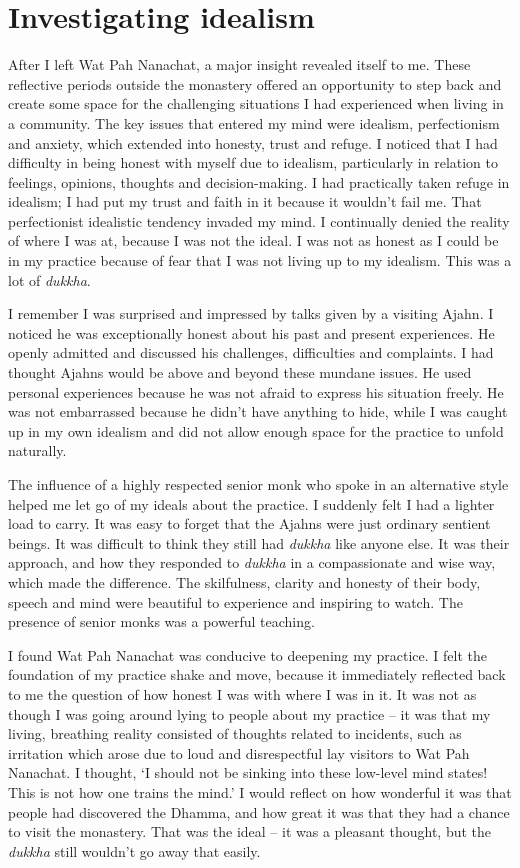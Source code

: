 \section{Investigating idealism}

After I left Wat Pah Nanachat, a major insight revealed itself to me. 
These reflective periods outside the monastery offered an opportunity to
step back and create some space for the challenging situations I had
experienced when living in a community. The key issues that entered my
mind were idealism, perfectionism and anxiety, which extended into
honesty, trust and refuge. I noticed that I had difficulty in being
honest with myself due to idealism, particularly in relation to
feelings, opinions, thoughts and decision-making. I had practically
taken refuge in idealism; I had put my trust and faith in it because it
wouldn't fail me. That perfectionist idealistic tendency invaded my
mind. I continually denied the reality of where I was at, because I was
not the ideal. I was not as honest as I could be in my practice because
of fear that I was not living up to my idealism. This was a lot of
\emph{dukkha}. 

I remember I was surprised and impressed by talks given by a visiting
Ajahn. I noticed he was exceptionally honest about his past and present
experiences. He openly admitted and discussed his challenges, 
difficulties and complaints. I had thought Ajahns would be above and
beyond these mundane issues. He used personal experiences because he was
not afraid to express his situation freely. He was not embarrassed
because he didn't have anything to hide, while I was caught up in my own
idealism and did not allow enough space for the practice to unfold
naturally.

The influence of a highly respected senior monk who spoke in
an alternative style helped me let go of my ideals about the practice. I
suddenly felt I had a lighter load to carry. It was easy to forget that
the Ajahns were just ordinary sentient beings. It was
difficult to think they still had \emph{dukkha} like anyone else. It was
their approach, and how they responded to \emph{dukkha} in a
compassionate and wise way, which made the difference. The skilfulness, 
clarity and honesty of their body, speech and mind were beautiful to
experience and inspiring to watch. The presence of senior monks was a
powerful teaching. 

I found Wat Pah Nanachat was conducive to deepening my practice. I felt
the foundation of my practice shake and move, because it immediately
reflected back to me the question of how honest I was with where I was
in it. It was not as though I was going around lying to people about my
practice -- it was that my living, breathing reality consisted of
thoughts related to incidents, such as irritation which arose due to
loud and disrespectful lay visitors to Wat Pah Nanachat. I thought, `I
should not be sinking into these low-level mind states! This is not how
one trains the mind.' I would reflect on how wonderful it was that
people had discovered the Dhamma, and how great it was that they had a
chance to visit the monastery. That was the ideal -- it was a pleasant
thought, but the \emph{dukkha} still wouldn't go away that easily.

